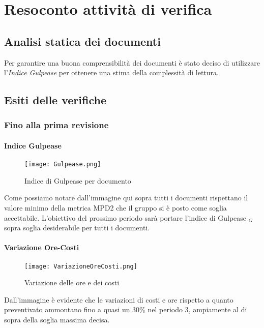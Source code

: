 \chapter{Resoconto attività di verifica}
\section{Analisi statica dei documenti}
Per garantire una buona comprensibilità dei documenti è stato deciso di utilizzare l'\textit{Indice Gulpease} per ottenere una stima della complessità di lettura.
\section{Esiti delle verifiche}
    \subsection{Fino alla prima revisione}
      \subsubsection{Indice Gulpease}  
        \begin{figure}[h!]
            \centering
            \texttt{[image: Gulpease.png]}
            \caption{Indice di Gulpease per documento}
        \end{figure}
        Come possiamo notare dall'immagine qui sopra tutti i documenti rispettano il valore minimo della metrica MPD2 che il gruppo si è posto come soglia accettabile. L'obiettivo del prossimo periodo sarà portare l'indice di Gulpease $_G$ sopra soglia desiderabile per tutti i documenti. 
      \subsubsection{Variazione Ore-Costi}  
        \begin{figure}[h!]
            \centering
            \texttt{[image: VariazioneOreCosti.png]}
            \caption{Variazione delle ore e dei costi}
        \end{figure}
        Dall'immagine è evidente che le variazioni di costi e ore rispetto a quanto preventivato ammontano fino a quasi un 30\% nel periodo 3, ampiamente al di sopra della soglia massima decisa.
